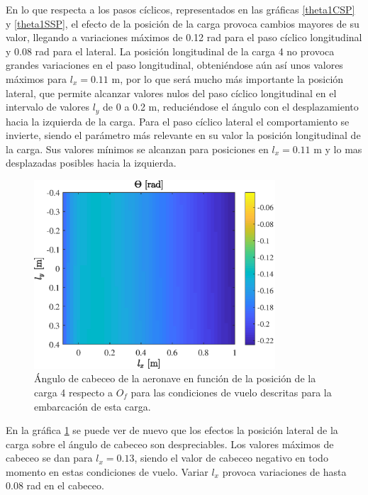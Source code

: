En lo que respecta a los pasos cíclicos, representados en las gráficas \ref{theta1CSP} y \ref{theta1SSP}, el efecto de la posición de la carga provoca cambios mayores de su valor, llegando a variaciones máximos de 0.12 rad para el paso cíclico longitudinal y 0.08 rad para el lateral.
La posición longitudinal de la carga 4 no provoca grandes variaciones en el paso longitudinal, obteniéndose aún así unos valores máximos para $l_x=0.11$ m, por lo que será mucho más importante la posición lateral, que permite alcanzar valores nulos del paso cíclico longitudinal en el intervalo de valores $l_y$ de 0 a 0.2 m, reduciéndose el ángulo con el desplazamiento hacia la izquierda de la carga.
Para el paso cíclico lateral el comportamiento se invierte, siendo el parámetro más relevante en su valor la posición longitudinal de la carga. Sus valores mínimos se alcanzan para posiciones en $l_x=0.11$ m y lo mas desplazadas posibles hacia la izquierda.

\begin{figure}
	\centering
	\includegraphics[width=90mm]{graficos/CabSP}
	\caption{Ángulo de cabeceo de la aeronave en función de la posición de la carga 4 respecto a $O_f$ para las condiciones de vuelo descritas para la embarcación de esta carga.}
	\label{CabSP}
\end{figure}

En la gráfica \ref{CabSP} se puede ver de nuevo que los efectos la posición lateral de la carga sobre el ángulo de cabeceo son despreciables. Los valores máximos de cabeceo se dan para $l_x=0.13$, siendo el valor de cabeceo negativo en todo momento en estas condiciones de vuelo. Variar $l_x$ provoca variaciones de hasta 0.08 rad en el cabeceo.

